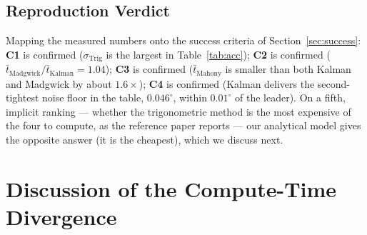\documentclass[conference]{IEEEtran}
\newcommand{\degr}{^{\circ}}
\begin{document}
\subsection{Reproduction Verdict}

Mapping the measured numbers onto the success criteria of
Section~\ref{sec:success}: \textbf{C1} is confirmed
($\sigma_{\mathrm{Trig}}$ is the largest in
Table~\ref{tab:acc}); \textbf{C2} is confirmed
($\bar{t}_{\mathrm{Madgwick}}/\bar{t}_{\mathrm{Kalman}} = 1.04$);
\textbf{C3} is confirmed
($\bar{t}_{\mathrm{Mahony}}$ is smaller than both Kalman and
Madgwick by about $1.6\times$); \textbf{C4} is confirmed (Kalman
delivers the second-tightest noise floor in the table, $0.046\degr$,
within $0.01\degr$ of the leader). On a fifth, implicit ranking
--- whether the trigonometric method is the most expensive of the
four to compute, as the reference paper reports --- our analytical
model gives the opposite answer (it is the cheapest), which we
discuss next.

\section{Discussion of the Compute-Time Divergence}\label{sec:disc}
\end{document}
